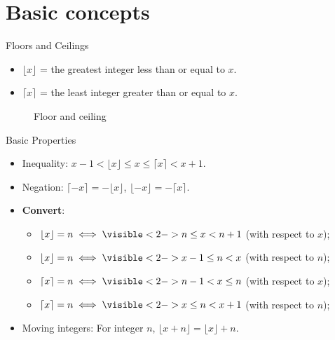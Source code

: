 \section{Basic concepts}

\begin{frame}{Floors and Ceilings}
\begin{definition}
    \begin{itemize}
        \item $\lfloor x \rfloor$ = the greatest integer less 
        than or equal to $x$. 
        \item $\lceil x \rceil$ = the least integer greater 
        than or equal to $x$. 
    \end{itemize}
\end{definition}

    \begin{figure}
        \centering
        
        \caption{Floor and ceiling}
    \end{figure}
\end{frame}

\begin{frame}{Basic Properties}
    \begin{itemize}
        \item Inequality: $x-1<\lfloor x\rfloor \leq x \leq \lceil x \rceil<x+1$. 
        \item Negation: $\lceil -x \rceil = -\lfloor x \rfloor$, $\lfloor -x \rfloor = -\lceil x\rceil$. 
        \item \textbf{Convert}: 
        \begin{itemize}
            \item $\lfloor x \rfloor = n \iff \visible<2->{ n\leq x < n+1} $ (with respect to $x$);
            \item $\lfloor x \rfloor = n \iff \visible<2->{ x-1\leq n < x}$ (with respect to $n$);
            \item $\lceil x \rceil = n \iff \visible<2->{ n-1 < x \leq n} $ (with respect to $x$);
            \item $\lceil x \rceil = n \iff \visible<2->{ x\leq n < x+1}$ (with respect to $n$);
        \end{itemize}
        \item Moving integers: For integer $n$, $\lfloor x+n \rfloor=\lfloor x \rfloor+n$.
    \end{itemize}
    
\end{frame}

